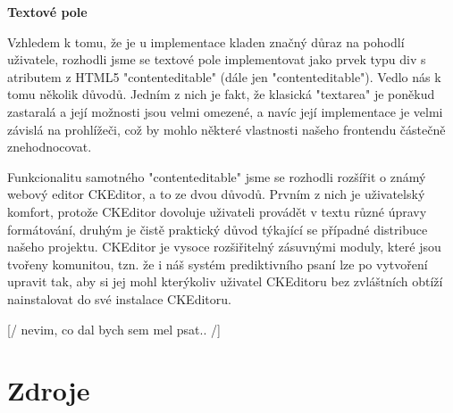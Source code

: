\documentclass{article}
\begin{document}
{\bf Textové pole}

Vzhledem k tomu, že je u implementace kladen značný důraz na pohodlí uživatele, rozhodli jsme se textové pole implementovat jako prvek typu div s atributem z HTML5 "contenteditable" (dále jen "contenteditable"). Vedlo nás k tomu několik důvodů. Jedním z nich je fakt, že klasická "textarea" je poněkud zastaralá a její možnosti jsou velmi omezené, a navíc její implementace je velmi závislá na prohlížeči, což by mohlo některé vlastnosti našeho frontendu částečně znehodnocovat. 

Funkcionalitu samotného "contenteditable" jsme se rozhodli rozšířit o známý webový editor CKEditor, a to ze dvou důvodů. Prvním z nich je uživatelský komfort, protože CKEditor dovoluje uživateli provádět v textu různé úpravy formátování, druhým je čistě praktický důvod týkající se případné distribuce našeho projektu. CKEditor je vysoce rozšiřitelný zásuvnými moduly, které jsou tvořeny komunitou, tzn. že i náš systém prediktivního psaní lze po vytvoření upravit tak, aby si jej mohl kterýkoliv uživatel CKEditoru bez zvláštních obtíží nainstalovat do své instalace CKEditoru.

[/ nevim, co dal bych sem mel psat.. /]




	

\section{Zdroje}



\end{document}
